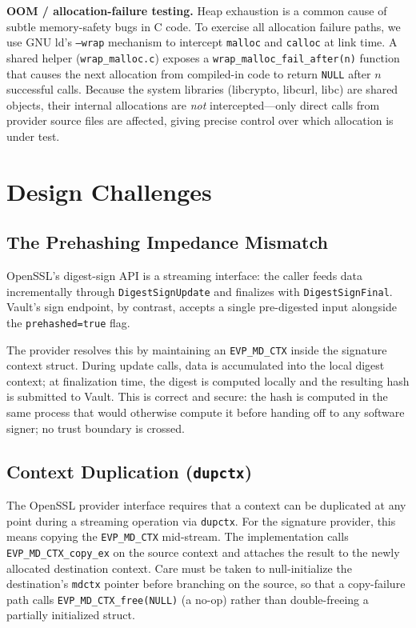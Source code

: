 \documentclass[sigconf,10pt]{acmart}
\begin{document}
\textbf{OOM / allocation-failure testing.}  Heap exhaustion is a
common cause of subtle memory-safety bugs in C code.  To exercise all
allocation failure paths, we use GNU ld's \texttt{--wrap} mechanism to
intercept \texttt{malloc} and \texttt{calloc} at link time.  A shared helper
(\texttt{wrap\_malloc.c}) exposes a \texttt{wrap\_malloc\_fail\_after(n)}
function that causes the next allocation from compiled-in code to return
\texttt{NULL} after $n$ successful calls.  Because the system libraries
(libcrypto, libcurl, libc) are shared objects, their internal allocations
are \emph{not} intercepted---only direct calls from provider source files
are affected, giving precise control over which allocation is under test.

\section{Design Challenges}
\label{sec:challenges}

\subsection{The Prehashing Impedance Mismatch}

OpenSSL's digest-sign API is a streaming interface: the caller feeds data
incrementally through \texttt{Digest\-Sign\-Update} and finalizes with
\texttt{Digest\-Sign\-Final}.  Vault's sign endpoint, by contrast, accepts
a single pre-digested input alongside the \texttt{prehashed=true} flag.

The provider resolves this by maintaining an \texttt{EVP\_MD\_CTX} inside
the signature context struct.  During update calls, data is accumulated into
the local digest context; at finalization time, the digest is computed
locally and the resulting hash is submitted to Vault.  This is correct and
secure: the hash is computed in the same process that would otherwise compute
it before handing off to any software signer; no trust boundary is crossed.

\subsection{Context Duplication (\texttt{dupctx})}

The OpenSSL provider interface requires that a context can be duplicated at
any point during a streaming operation via \texttt{dupctx}.  For the
signature provider, this means copying the \texttt{EVP\_MD\_CTX} mid-stream.
The implementation calls \texttt{EVP\_MD\_CTX\_copy\_ex} on the source
context and attaches the result to the newly allocated destination context.
Care must be taken to null-initialize the destination's \texttt{mdctx}
pointer before branching on the source, so that a copy-failure path calls
\texttt{EVP\_MD\_CTX\_free(NULL)} (a no-op) rather than double-freeing a
partially initialized struct.
\end{document}
